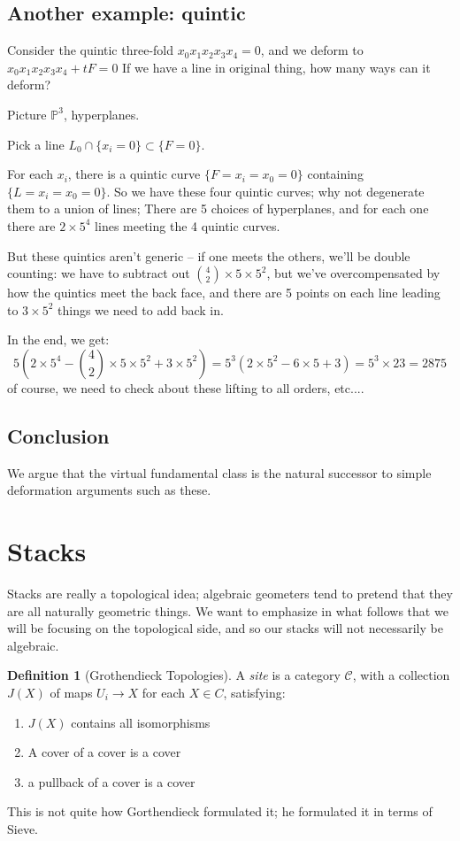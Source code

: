 \documentclass{amsart}
\theoremstyle{definition}
\newtheorem{definition}[dummy]{Definition}
\newcommand{\proj}{\mathbb{P}}
\begin{document}
\subsection{Another example: quintic}

Consider the quintic three-fold
$x_0x_1x_2x_3x_4=0$, and we deform to $x_0x_1x_2x_3x_4+tF=0$
If we have a line in original thing, how many ways can it deform?

Picture $\proj^3$, hyperplanes.

Pick a line $L_0\cap\{x_i=0\}\subset\{F=0\}$.

For each $x_i$, there is a quintic curve $\{ F=x_i=x_0=0\}$ containing $\{L=x_i=x_0=0\}$.  So we have these four quintic curves; why not degenerate them to a union of lines;  There are 5 choices of hyperplanes, and for each one there are $2\times 5^4$ lines meeting the 4 quintic curves.  

But these quintics aren't generic -- if one meets the others, we'll be double counting: we have to subtract out $\binom{4}{2}\times 5\times 5^2$, but we've overcompensated by how the quintics meet the back face, and there are 5 points on each line leading to $3\times 5^2$ things we need to add back in.

In the end, we get:
$$5\left(2\times 5^4-\binom{4}{2}\times 5\times 5^2+3\times 5^2\right)=5^3(2\times 5^2-6\times 5+3)=5^3\times 23=2875$$
of course, we need to check about these lifting to all orders, etc....

\subsection{Conclusion}
We argue that the virtual fundamental class is the natural successor to simple deformation arguments such as these.

\section{Stacks}
Stacks are really a topological idea; algebraic geometers tend to pretend that they are all naturally geometric things.  We want to emphasize in what follows that we will be focusing on the topological side, and so our stacks will not necessarily be algebraic.

\begin{definition}[Grothendieck Topologies]
A \emph{site} is a category $\mathcal{C}$, with a collection $J(X)$ of maps $U_i\to X$ for each $X\in C$, satisfying:

\begin{enumerate}
\item $J(X)$ contains all isomorphisms
\item A cover of a cover is a cover
\item a pullback of a cover is a cover 
\end{enumerate}

\end{definition}
This is not quite how Gorthendieck formulated it; he formulated it in terms of Sieve.
\end{document}
